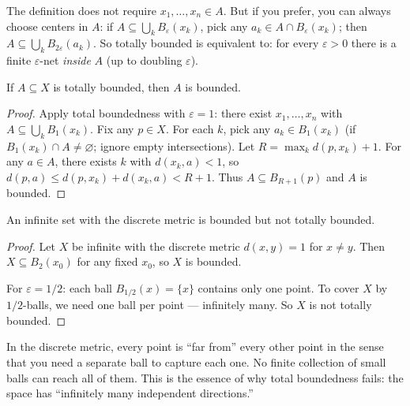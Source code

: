 \begin{remark*}
The definition does not require $x_1, \ldots, x_n \in A$.
But if you prefer, you can always choose centers in $A$:
if $A \subseteq \bigcup_k B_\varepsilon(x_k)$, pick any $a_k \in A \cap B_\varepsilon(x_k)$;
then $A \subseteq \bigcup_k B_{2\varepsilon}(a_k)$.
So totally bounded is equivalent to: for every $\varepsilon > 0$ there
is a finite $\varepsilon$-net \emph{inside} $A$ (up to doubling $\varepsilon$).
\end{remark*}


\begin{proposition}
\label{prop:totally-bounded-implies-bounded}
If $A \subseteq X$ is totally bounded, then $A$ is bounded.
\end{proposition}

\begin{proof}
Apply total boundedness with $\varepsilon = 1$: there exist
$x_1, \ldots, x_n$ with $A \subseteq \bigcup_k B_1(x_k)$.
Fix any $p \in X$.
For each $k$, pick any $a_k \in B_1(x_k)$ (if $B_1(x_k) \cap A \neq \varnothing$;
ignore empty intersections).
Let $R = \max_k d(p, x_k) + 1$.
For any $a \in A$, there exists $k$ with $d(x_k, a) < 1$, so
$d(p, a) \le d(p, x_k) + d(x_k, a) < R + 1$.
Thus $A \subseteq B_{R+1}(p)$ and $A$ is bounded.
\end{proof}


\begin{proposition}
\label{prop:bounded-not-totally-bounded}
An infinite set with the discrete metric is bounded but not totally bounded.
\end{proposition}

\begin{proof}
Let $X$ be infinite with the discrete metric $d(x,y) = 1$ for $x \neq y$.
Then $X \subseteq B_2(x_0)$ for any fixed $x_0$, so $X$ is bounded.

For $\varepsilon = 1/2$: each ball $B_{1/2}(x) = \{x\}$ contains only one point.
To cover $X$ by $1/2$-balls, we need one ball per point --- infinitely many.
So $X$ is not totally bounded.
\end{proof}

\begin{remark*}
In the discrete metric, every point is ``far from'' every other
point in the sense that you need a separate ball to capture each one.
No finite collection of small balls can reach all of them.
This is the essence of why total boundedness fails: the space has
``infinitely many independent directions.''
\end{remark*}


